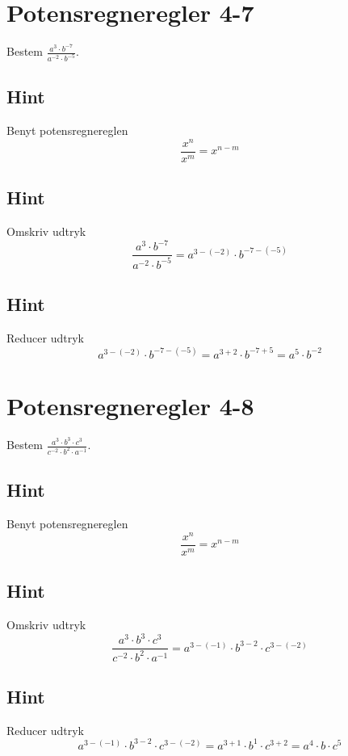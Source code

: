 \documentclass{article}
\newenvironment{exercise}[1]{\newpage\section{#1}}{}
\newcommand{\answerbox}[1]{\fbox{$#1$}}
\newcommand{\hint}{\subsection*{Hint}}
\begin{document}
\newpage

\begin{exercise}{Potensregneregler 4-7}
	
	Bestem $\frac{a^3 \cdot b^{-7}}{a^{-2}\cdot b^{-5}}$.
	
	\answerbox{a^5 \cdot b^{-2}}
	
	\hint
	
	Benyt potensregnereglen
	\[
	\frac{x^n}{x^m} = x^{n-m} 
	\]
	
	\hint 
	
	Omskriv udtryk
	\[
	\frac{a^3 \cdot b^{-7}}{a^{-2}\cdot b^{-5}} = a^{3-(-2)} \cdot b^{-7-(-5)}	
	\]
	
	\hint
	
	Reducer udtryk
	\[
	a^{3-(-2)} \cdot b^{-7-(-5)} = a^{3+2} \cdot b^{-7+5} = a^5 \cdot b^{-2}
	\]
	
	
\end{exercise}

\newpage

\begin{exercise}{Potensregneregler 4-8}
	
	Bestem $\frac{a^3 \cdot b^3 \cdot c^3}{c^{-2} \cdot b^2 \cdot a^{-1}}$.
	
	\answerbox{a^4 \cdot b \cdot c^5}
	
	\hint
	
	Benyt potensregnereglen
	\[
	\frac{x^n}{x^m} = x^{n-m} 
	\]
	
	\hint 
	
	Omskriv udtryk
	\[
	\frac{a^3 \cdot b^3 \cdot c^3}{c^{-2} \cdot b^2 \cdot a^{-1}} = a^{3-(-1)} \cdot b^{3-2} \cdot c^{3-(-2)}
	\]
	
	\hint
	
	Reducer udtryk
	\[
	a^{3-(-1)} \cdot b^{3-2} \cdot c^{3-(-2)} = a^{3+1} \cdot b^1 \cdot c^{3+2} = a^4 \cdot b \cdot c^5
	\]
	
	
\end{exercise}
\end{document}
